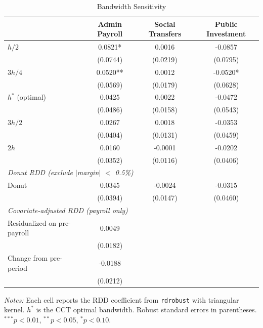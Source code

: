 \begin{table}[htbp]
\centering
\begin{threeparttable}
\caption{Bandwidth Sensitivity}
\label{tab:bandwidth}
\begin{tabular}{lccc}
\toprule
 & Admin Payroll & Social Transfers & Public Investment \\
\midrule
$h/2$ & 0.0821* & 0.0016 & -0.0857 \\
  & (0.0744) & (0.0219) & (0.0795) \\
$3h/4$ & 0.0520** & 0.0012 & -0.0520* \\
  & (0.0569) & (0.0179) & (0.0628) \\
$h^*$ (optimal) & 0.0425 & 0.0022 & -0.0472 \\
  & (0.0486) & (0.0158) & (0.0543) \\
$3h/2$ & 0.0267 & 0.0018 & -0.0353 \\
  & (0.0404) & (0.0131) & (0.0459) \\
$2h$ & 0.0160 & -0.0001 & -0.0202 \\
  & (0.0352) & (0.0116) & (0.0406) \\
\midrule
\multicolumn{4}{l}{\textit{Donut RDD (exclude $|$margin$|$ $<$ 0.5\%)}} \\
Donut & 0.0345 & -0.0024 & -0.0315 \\
  & (0.0394) & (0.0147) & (0.0460) \\
\midrule
\multicolumn{4}{l}{\textit{Covariate-adjusted RDD (payroll only)}} \\
Residualized on pre-payroll & 0.0049 & & \\
 & (0.0182) & & \\
Change from pre-period & -0.0188 & & \\
 & (0.0212) & & \\
\bottomrule
\end{tabular}
\begin{tablenotes}[flushleft]
\small
\item \textit{Notes:} Each cell reports the RDD coefficient from \texttt{rdrobust} with triangular kernel. $h^*$ is the CCT optimal bandwidth. Robust standard errors in parentheses. $^{***}p<0.01$, $^{**}p<0.05$, $^{*}p<0.10$.
\end{tablenotes}
\end{threeparttable}
\end{table}
